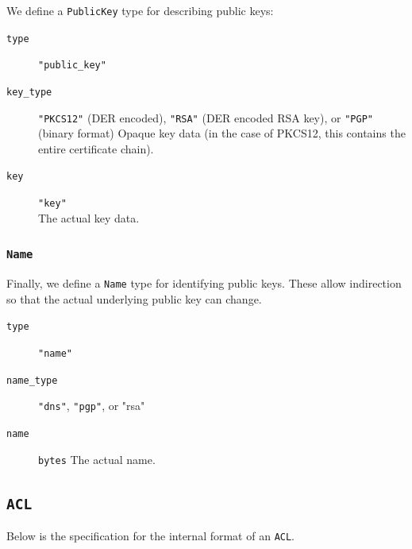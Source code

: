\documentclass[pdftex,12pt,a4papaer,twoside,notitlepage]{report}
\begin{document}
\begin{appendices}
We define a \texttt{PublicKey} type for describing public keys:

\begin{leftbar}
\begin{description}
\item[\texttt{type}] \verb="public_key"=
\item[\texttt{key\_type}] \verb="PKCS12"= (DER encoded), \verb="RSA"= (DER
  encoded RSA key), or \verb="PGP"= (binary format) Opaque key data (in the case
  of PKCS12, this contains the entire certificate chain).
\item[\texttt{key}] \verb="key"= \\
  The actual key data.
\end{description}
\end{leftbar}

\subsubsection{\texttt{Name}}

Finally, we define a \texttt{Name} type for identifying public keys. These allow
indirection so that the actual underlying public key can change.

\begin{leftbar}
\begin{description}
  \item[\texttt{type}] \verb="name"=
  \item[\texttt{name\_type}] \verb="dns"=, \verb="pgp"=, or "rsa"
  \item[\texttt{name}] \texttt{bytes}
    The actual name.
\end{description}
\end{leftbar}

\subsection{\texttt{ACL}}

Below is the specification for the internal format of an \texttt{ACL}.


\end{appendices}
\end{document}
